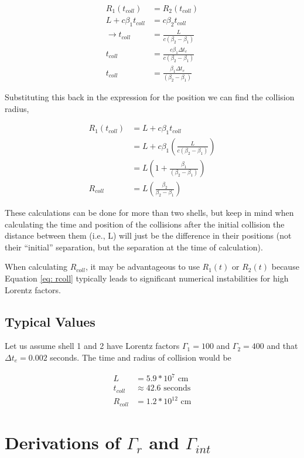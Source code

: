 \documentclass[linenumbers,twocolumn]{aastex631}
\begin{document}
\begin{appendix}
\begin{align}
	R_1(t_{coll}) &= R_2(t_{coll}) \\ 
	L + c\beta_1t_{coll}&= c\beta_2t_{coll}\\
	\rightarrow t_{coll}&= \frac{L}{c(\beta_2 - \beta_1)}\\
	t_{coll}&= \frac{c\beta_1 \Delta t_e}{c(\beta_2 - \beta_1)}\\
	t_{coll}&= \frac{\beta_1 \Delta t_e}{(\beta_2 - \beta_1)}
\end{align}

Substituting this back in the expression for the position we can find the collision radius, 

\begin{align}
	R_1(t_{coll}) &= L + c\beta_1 t_{coll} \\
	&= L+c\beta_1\left(\frac{L}{c(\beta_2-\beta_1)}\right) \\
	&= L\left(1+\frac{\beta_1}{(\beta_2-\beta_1)}\right)\\
	R_{coll} &= L\left(\frac{\beta_2}{\beta_2-\beta_1}\right) \label{eq: rcoll}
\end{align}

These calculations can be done for more than two shells, but keep in mind when calculating the time and position of the collisions after the initial collision the distance between them (i.e., L) will just be the difference in their positions (not their ``initial'' separation, but the separation at the time of calculation).

When calculating $R_{coll}$, it may be advantageous to use $R_1(t)$ or $R_2(t)$
because Equation \ref{eq: rcoll} typically leads to significant numerical instabilities for high Lorentz factors.

\subsection{Typical Values}

Let us assume shell 1 and 2 have Lorentz factors $\Gamma_1=100$ and $\Gamma_2=400$ and that $\Delta t_e = 0.002$ seconds. The time and radius of collision would be

\begin{align}
	L &= 5.9 * 10^7 \text{ cm} \\ 
	t_{coll} &\approx 42.6 \text{ seconds}\\
	R_{coll} &= 1.2*10^{12} \text{ cm}
\end{align}


\section[Derivations of Gamma_r and Gamma_int]{Derivations of $\Gamma_r$ and $\Gamma_{int}$}


\end{appendix}
\end{document}
